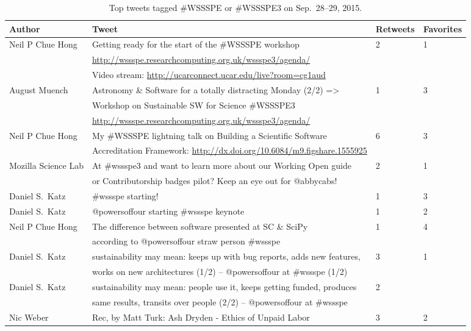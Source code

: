\documentclass[11pt, oneside]{amsart}
\begin{document}
\begin{table*}[t]
\centering
\caption{Top tweets tagged \#WSSSPE or \#WSSSPE3 on Sep.\ 28--29, 2015.}\label{tab:tweets}
  \begin{scriptsize}
  \begin{tabular}{@{}l l l l@{}}
 \toprule
    Author  &   Tweet  & Retweets &  Favorites
\\ \midrule
Neil P Chue Hong  &  Getting ready for the start of the \#WSSSPE workshop & 2 & 1
\\ & \url{http://wssspe.researchcomputing.org.uk/wssspe3/agenda/}  & &
\\ & Video stream: \url{http://ucarconnect.ucar.edu/live?room=cg1aud} & &
%
\\ August Muench & Astronomy \& Software for a totally distracting Monday (2/2) => & 1 & 3
\\ & Workshop on Sustainable SW for Science \#WSSSPE3 & & 
\\ & \url{http://wssspe.researchcomputing.org.uk/wssspe3/agenda/} & &
%
\\ Neil P Chue Hong & My \#WSSSPE lightning talk on Building a Scientific Software & 6 & 3
\\ &  Accreditation Framework: \url{http://dx.doi.org/10.6084/m9.figshare.1555925} & & 
%
\\ Mozilla Science Lab & At \#wssspe3 and want to learn more about our Working Open guide & 2 & 1 
\\ &  or Contributorship badges pilot? Keep an eye out for @abbycabs! & & 
%
\\ Daniel S.\ Katz & \#wssspe starting! & 1 & 3
%
\\ Daniel S.\ Katz & @powersoffour starting \#wssspe keynote & 1 & 2
%
\\ Neil P Chue Hong   &  The difference between software presented at SC \& SciPy & 1 & 4
\\  &  according to @powersoffour straw person \#wssspe & &
%
\\ Daniel S.\ Katz & sustainability may mean: keeps up with bug reports, adds new features, & 3 & 1
\\ &  works on new architectures (1/2)  -- @powersoffour at \#wssspe (1/2) & & 
%
\\ Daniel S.\ Katz & sustainability may mean: people use it, keeps getting funded, produces & 2 & 
\\ &  same results, transits over people (2/2)  -- @powersoffour at \#wssspe & &
%
\\ Nic Weber & Rec, by Matt Turk: Ash Dryden - Ethics of Unpaid Labor & 3 & 2 

\end{tabular}
\end{scriptsize}
\end{table*}
\end{document}
